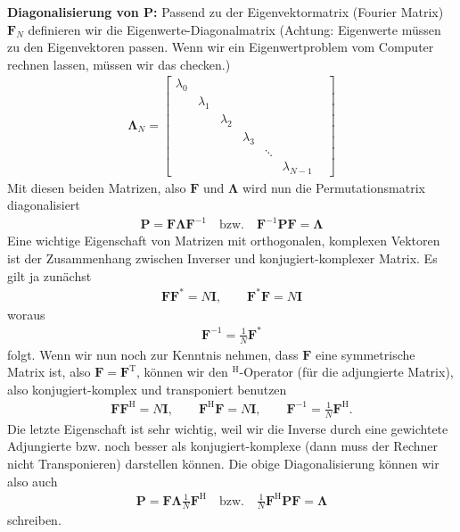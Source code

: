 \textbf{Diagonalisierung von $\bm{P}$:}
Passend zu der Eigenvektormatrix (Fourier Matrix)
$\bm{F}_N$ definieren wir die Eigenwerte-Diagonalmatrix (Achtung: Eigenwerte
müssen zu den Eigenvektoren passen. Wenn wir ein Eigenwertproblem vom Computer
rechnen lassen, müssen wir das checken.)
\begin{align}
\bm{\Lambda}_N =
\begin{bmatrix}
\lambda_0 & & & & &\\
&\lambda_1 & & & & \\
&&\lambda_2 & & & \\
&&&\lambda_3 & & \\
&&&& \ddots& & \\
&&&&&\lambda_{N-1}
\end{bmatrix}
\end{align}
Mit diesen beiden Matrizen, also $\bm{F}$ und $\bm{\Lambda}$ wird nun die
Permutationsmatrix diagonalisiert
\begin{align}
\bm{P}  = \bm{F} \bm{\Lambda} \bm{F}^{-1} \quad\text{bzw.}\quad
\bm{F}^{-1} \bm{P} \bm{F} = \bm{\Lambda}
\end{align}
Eine wichtige Eigenschaft von Matrizen mit orthogonalen, komplexen Vektoren
ist der Zusammenhang zwischen Inverser und konjugiert-komplexer Matrix.
Es gilt ja zunächst
\begin{align}
\bm{F}\bm{F}^* = N \bm{I}, \qquad \bm{F}^*\bm{F} = N \bm{I}
\end{align}
woraus
\begin{align}
\bm{F}^{-1} = \frac{1}{N} \bm{F}^*
\end{align}
folgt.
Wenn wir nun noch zur Kenntnis nehmen, dass $\bm{F}$ eine symmetrische Matrix ist,
also $\bm{F}=\bm{F}^\mathrm{T}$, können wir den $^\mathrm{H}$-Operator (für die adjungierte
Matrix), also konjugiert-komplex und transponiert benutzen
\begin{align}
\bm{F}\bm{F}^\mathrm{H} = N \bm{I},\qquad
\bm{F}^\mathrm{H}\bm{F} = N \bm{I},\qquad
\bm{F}^{-1} = \frac{1}{N} \bm{F}^\mathrm{H}.
\end{align}
Die letzte Eigenschaft ist sehr wichtig, weil wir die Inverse durch eine
gewichtete Adjungierte bzw. noch besser als konjugiert-komplexe (dann muss der Rechner
nicht Transponieren) darstellen können.
%
Die obige Diagonalisierung können wir also auch
\begin{align}
\bm{P}  = \bm{F} \bm{\Lambda} \frac{1}{N} \bm{F}^\mathrm{H} \quad\text{bzw.}\quad
\frac{1}{N} \bm{F}^\mathrm{H} \bm{P} \bm{F} = \bm{\Lambda}
\end{align}
schreiben.

